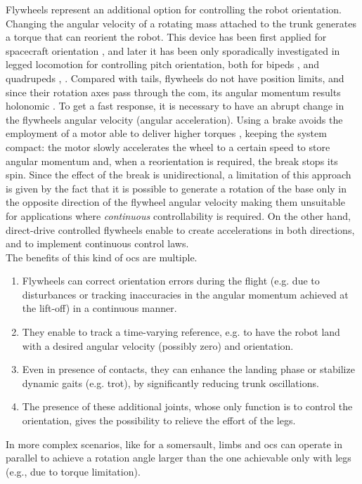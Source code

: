 \documentclass[sensors,article,submit,pdftex,moreauthors]{Definitions/mdpi}
\begin{document}
Flywheels represent an additional option for controlling the robot orientation.
Changing the angular velocity of a rotating mass attached to the trunk generates a torque that can reorient the robot. This device has been first applied for spacecraft orientation \cite{oland2009reaction}, and later it has been only sporadically investigated in legged locomotion for controlling pitch orientation, both for bipeds \cite{Brown2016}, \cite{xiong2020sequential} and quadrupeds \cite{kolvenbach2019towards}, \cite{vasilopoulos2016quadruped}.
Compared with tails, flywheels do not have position limits, and since their rotation axes pass through the \gls{com}, its angular momentum results holonomic \cite{machairas2015quadruped}.
To get a fast response, it is necessary to have an abrupt change in the flywheels angular velocity (angular acceleration).
Using a brake avoids the employment of a motor able to deliver higher torques \cite{gajamohan2012cubli}, 
keeping the system compact: the motor slowly accelerates the wheel to a certain speed to store angular momentum and, when a reorientation is required, the break stops its spin.
Since the effect of the break is unidirectional, a limitation of this approach is given by the fact that it is possible to generate a rotation of the base only in the opposite direction of the flywheel angular velocity making them unsuitable for applications where \textit{continuous} controllability is required. On the other hand, direct-drive controlled flywheels enable to create accelerations in both directions,  and  to implement continuous control laws. \\
The benefits of this kind of \gls{ocs} are multiple. 
\begin{enumerate}
\item Flywheels can correct orientation errors during the flight (e.g. due to disturbances or tracking inaccuracies in the angular momentum achieved at the lift-off)   %
in a continuous manner. 
\item They enable to track a time-varying reference, e.g. to have the robot land with a desired angular velocity (possibly zero) and orientation.
\item  Even in presence of contacts, they can enhance the landing phase or stabilize dynamic gaits (e.g. trot), by significantly reducing trunk oscillations.  
\item  The presence of these additional joints, whose only function is to control the orientation, gives the possibility to relieve the effort of the legs.
\end{enumerate}
In more complex scenarios, like for a somersault, limbs and \gls{ocs} can operate in parallel to achieve a rotation angle larger than the one achievable only with legs (e.g., due to torque limitation). 
\end{document}
